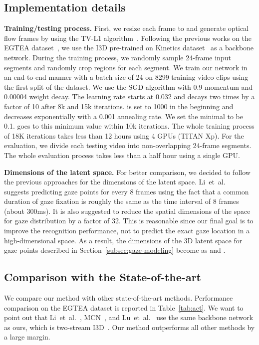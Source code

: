 \documentclass[10pt,twocolumn,letterpaper]{article}
\begin{document}
\subsection{Implementation details} \label{subsec:imp}
\textbf{Training/testing process. } First, we resize each frame to  and generate optical flow frames by using the TV-L1 algorithm~\cite{zach2007duality}. Following the previous works on the EGTEA dataset~\cite{huang2019mutual,li2018eye}, we use the I3D pre-trained on Kinetics dataset~\cite{carreira2017quo} as a backbone network. During the training process, we randomly sample 24-frame input segments and randomly crop  regions for each segment. We train our network in an end-to-end manner with a batch size of 24 on 8299 training video clips using the first split of the dataset. We use the SGD algorithm with 0.9 momentum and 0.00004 weight decay. The learning rate starts at 0.032 and decays two times by a factor of 10 after 8k and 15k iterations.  is set to 1000 in the beginning and decreases exponentially with a 0.001 annealing rate. We set the minimal  to be 0.1.  goes to this minimum value within 10k iterations. The whole training process of 18K iterations takes less than 12 hours using 4 GPUs (TITAN Xp). For the evaluation, we divide each testing video into non-overlapping 24-frame segments. The whole evaluation process takes less than a half hour using a single GPU.

\textbf{Dimensions of the latent space. } For better comparison, we decided to follow the previous approaches for the dimensions of the latent space. Li~et~al.~\cite{li2018eye} suggests predicting gaze points for every 8 frames using the fact that a common duration of gaze fixation is roughly the same as the time interval of 8 frames (about 300ms). It is also suggested to reduce the spatial dimensions of the space for gaze distribution by a factor of 32. This is reasonable since our final goal is to improve the recognition performance, not to predict the exact gaze location in a high-dimensional space. As a result, the dimensions of the 3D latent space for gaze points described in Section~\ref{subsec:gaze-modeling} become  as  and .

\subsection{Comparison with the State-of-the-art} \label{subsec:comparison}

We compare our method with other state-of-the-art methods. Performance comparison on the EGTEA dataset is reported in Table~\ref{tab:act}. We want to point out that Li~et~al.~\cite{li2018eye}, MCN~\cite{huang2019mutual}, and Lu~et~al.~\cite{lu2019learning} use the same backbone network as ours, which is two-stream I3D~\cite{carreira2017quo}. Our method outperforms all other methods by a large margin.
\end{document}
